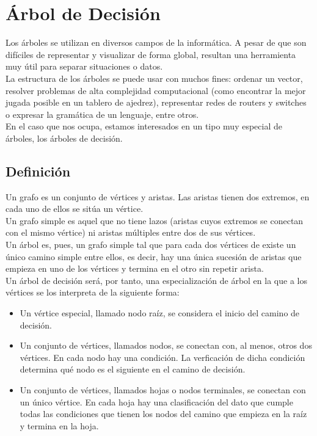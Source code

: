 \section{\'Arbol de Decisi\'on}\label{sec:Decision_tree}
	
		Los \'arboles se utilizan en diversos campos de la inform\'atica. A pesar de que son dif\'iciles de representar y visualizar de forma global, resultan una herramienta muy \'util para separar situaciones o datos.\\
		
		La estructura de los \'arboles se puede usar con muchos fines: ordenar un vector, resolver problemas de alta complejidad computacional (como encontrar la mejor jugada posible en un tablero de ajedrez), representar redes de routers y switches o expresar la gram\'atica de un lenguaje, entre otros.\\
		
		En el caso que nos ocupa, estamos interesados en un tipo muy especial de \'arboles, los \'arboles de decisi\'on.\\
		
		\subsection{Definici\'on}
			Un grafo es un conjunto de v\'ertices y aristas. Las aristas tienen dos extremos, en cada uno de ellos se sit\'ua un v\'ertice.\\
			
			Un grafo simple es aquel que no tiene lazos (aristas cuyos extremos se conectan con el mismo v\'ertice) ni aristas m\'ultiples entre dos de sus v\'ertices.\\
			
			Un \'arbol es, pues, un grafo simple tal que
			para cada dos v\'ertices de existe un \'unico camino simple entre ellos, es decir, hay una \'unica sucesi\'on de aristas que empieza en uno de los v\'ertices y termina en el otro sin repetir arista.\\
			
			Un \'arbol de decisi\'on ser\'a, por tanto, una especializaci\'on de \'arbol en la que a los v\'ertices se los interpreta de la siguiente forma:\\
			
			\begin{itemize}
				\item Un v\'ertice especial, llamado nodo ra\'iz, se considera el inicio del camino de decisi\'on.
				\item Un conjunto de v\'ertices, llamados nodos, se conectan con, al menos, otros dos v\'ertices. En cada nodo hay una condici\'on. La verficaci\'on de dicha condici\'on determina qu\'e nodo es el siguiente en el camino de decisi\'on.
				\item Un conjunto de v\'ertices, llamados hojas o nodos terminales, se conectan con un \'unico v\'ertice. En cada hoja hay una clasificaci\'on del dato que cumple todas las condiciones que tienen los nodos del camino que empieza en la ra\'iz y termina en la hoja. 
			\end{itemize}
			
